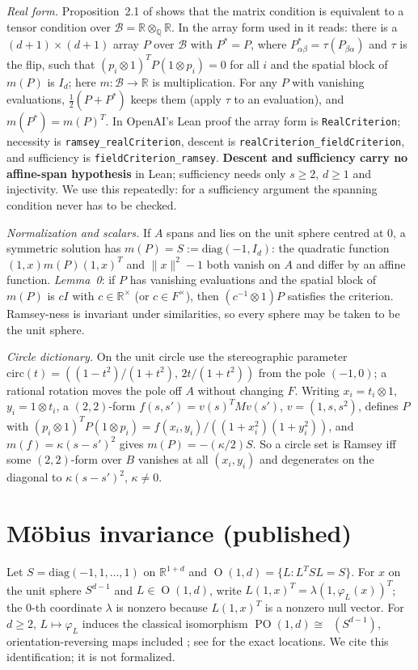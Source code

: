 \documentclass[11pt]{amsart}
\newcommand{\Q}{\mathbb{Q}}
\newcommand{\R}{\mathbb{R}}
\newcommand{\circmap}{\mathrm{circ}}
\newcommand{\BB}{\mathscr{B}}
\DeclareMathOperator{\PO}{PO}
\DeclareMathOperator{\Ort}{O}
\DeclareMathOperator{\Mob}{M\ddot{o}b}
\theoremstyle{plain}
\theoremstyle{definition}
\begin{document}
\noindent\emph{Real form.} Proposition~2.1 of \cite{OAI172} shows that the matrix condition is
equivalent to a tensor condition over $\BB=\R\otimes_\Q\R$. In the array form used in
\cite[\S1]{MR} it reads: there is a $(d+1)\times(d+1)$ array $P$ over $\BB$ with $P^*=P$, where
$P^*_{\alpha\beta}=\tau(P_{\beta\alpha})$ and $\tau$ is the flip, such that
$(p_i\otimes1)^TP(1\otimes p_i)=0$ for all $i$ and the spatial block of $m(P)$ is $I_d$; here
$m:\BB\to\R$ is multiplication. For any $P$ with vanishing evaluations, $\tfrac12(P+P^*)$ keeps them
(apply $\tau$ to an evaluation), and $m(P^*)=m(P)^T$. In OpenAI's Lean proof the array form is
\texttt{RealCriterion}; necessity is \texttt{ramsey\_realCriterion}, descent is
\texttt{realCriterion\_fieldCriterion}, and sufficiency is \texttt{fieldCriterion\_ramsey}.
\textbf{Descent and sufficiency carry no affine-span hypothesis} in Lean; sufficiency needs only
$s\ge2$, $d\ge1$ and injectivity. We use this repeatedly: for a sufficiency argument the spanning
condition never has to be checked.

\noindent\emph{Normalization and scalars.} If $A$ spans and lies on the unit sphere centred at $0$,
a symmetric solution has $m(P)=S:=\mathrm{diag}(-1,I_d)$: the quadratic function $(1,x)m(P)(1,x)^T$
and $\|x\|^2-1$ both vanish on $A$ and differ by an affine function. \emph{Lemma~0}: if $P$ has
vanishing evaluations and the spatial block of $m(P)$ is $cI$ with $c\in\R^\times$ (or
$c\in F^\times$), then $(c^{-1}\otimes1)P$ satisfies the criterion. Ramsey-ness is invariant under
similarities, so every sphere may be taken to be the unit sphere.

\noindent\emph{Circle dictionary.} On the unit circle use the stereographic parameter
$\circmap(t)=((1-t^2)/(1+t^2),\,2t/(1+t^2))$ from the pole $(-1,0)$; a rational rotation moves the
pole off $A$ without changing $F$. Writing $x_i=t_i\otimes1$, $y_i=1\otimes t_i$, a $(2,2)$-form
$f(s,s')=v(s)^TMv(s')$, $v=(1,s,s^2)$, defines $P$ with
$(p_i\otimes1)^TP(1\otimes p_i)=f(x_i,y_i)/((1+x_i^2)(1+y_i^2))$, and $m(f)=\kappa(s-s')^2$ gives
$m(P)=-(\kappa/2)S$. So a circle set is Ramsey iff some $(2,2)$-form over $B$ vanishes at all
$(x_i,y_i)$ and degenerates on the diagonal to $\kappa(s-s')^2$, $\kappa\neq0$.

\section{M\"obius invariance (published)}\label{sec:mobius}

Let $S=\mathrm{diag}(-1,1,\dots,1)$ on $\R^{1+d}$ and $\Ort(1,d)=\{L:L^TSL=S\}$. For $x$ on the
unit sphere $S^{d-1}$ and $L\in\Ort(1,d)$, write $L(1,x)^T=\lambda(1,\varphi_L(x))^T$; the
$0$-th coordinate $\lambda$ is nonzero because $L(1,x)^T$ is a nonzero null vector. For $d\ge2$,
$L\mapsto\varphi_L$ induces the classical isomorphism $\PO(1,d)\cong\Mob(S^{d-1})$,
orientation-reversing maps included \cite{Ratcliffe,Beardon}; see \cite[\S2]{MR} for the exact
locations. We cite this identification; it is not formalized.
\end{document}
